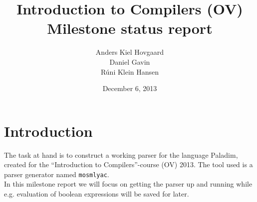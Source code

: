 \documentclass[12pt,a4paper]{article}
\begin{document}
\title{Introduction to Compilers (OV)\\
       Milestone status report}
\author{Anders Kiel Hovgaard\\
        Daniel Gavin\\
        Rúni Klein Hansen}
\date{December 6, 2013}
\maketitle

\section{Introduction}
The task at hand is to construct a working parser for the language Paladim,
created for the ``Introduction to Compilers''-course (OV) 2013. The tool used is
a parser generator named \texttt{mosmlyac}.\\
In this milestone report we will focus on getting the parser up and running
while e.g. evaluation of boolean expressions will be saved for later.
\end{document}
